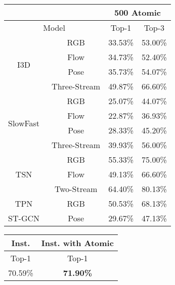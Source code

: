 \documentclass[10pt,twocolumn,letterpaper]{article}
\begin{document}
\begin{table*}[hbt!]
\begin{center}
        \begin{tabular}{|c|c|c|c|}
            \hline
            \multicolumn{2}{|c|}{} &
            \multicolumn{2}{|c|}{500 Atomic} \\
            \hline
              \multicolumn{2}{|c|}{Model}   & Top-1 & Top-3  \\
            \hline
            \multirow{4}{*}{I3D~\cite{i3d}} & RGB & 33.53\% & 53.00\%   \\
            & Flow                                & 34.73\% & 52.40\% \\
            & Pose                                & 35.73\% & 54.07\%  \\
            & Three-Stream                        & 49.87\% & 66.60\%  \\
            \hline
            \multirow{4}{*}{SlowFast~\cite{slowfast}} & RGB & 25.07\% & 44.07\%  \\
            & Flow                                          & 22.87\% & 36.93\%  \\
            & Pose                                          & 28.33\% & 45.20\%  \\
            & Three-Stream                                  & 39.93\% & 56.00\%  \\
            \hline
            \multirow{3}{*}{TSN~\cite{TSN}} & RGB & 55.33\% & 75.00\% \\
                                 & Flow & 49.13\% & 66.60\% \\
                                 & Two-Stream & 64.40\% & 80.13\% \\
            \hline
            \multirow{1}{*}{TPN~\cite{TPN}} & RGB & 50.53\% & 68.13\% \\
            \hline
            \multirow{1}{*}{ST-GCN~\cite{stgcn}} & Pose & 29.67\% & 47.13\% \\
            \hline
        \end{tabular}
\endminipage
{}
        \begin{tabular}{|c|c|}
            \hline
            \multicolumn{1}{|c|}{Inst.} &
            \multicolumn{1}{|c|}{Inst. with Atomic} \\
            \hline
            Top-1 & Top-1  \\
            \hline
             70.59\% & \bf{71.90}\%  \\

\end{tabular}
\end{center}
\end{table*}
\end{document}
